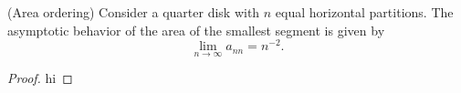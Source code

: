 \begin{myLemma}(Area ordering)
Consider a quarter disk with $n$ equal horizontal partitions. The asymptotic behavior of the area of the smallest segment is given by
\begin{equation}
  \lim_{n\to\infty} a_{nn} = n^{-2}.
\end{equation}
\end{myLemma}
%
\begin{proof}
hi
\end{proof}


\endinput %